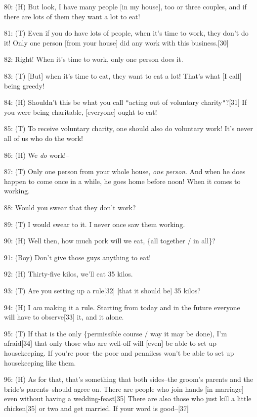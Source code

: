 80: (H) But look, I have many people [in my house], too or three couples, and if
there are lots of them they want a lot to eat!

81: (T) Even if you do have lots of people, when it's time to work, they don't
do it! Only one person [from your house] did any work with this business.[30]

82: Right! When it's time to work, only one person does it.

83: (T) [But] when it's time to eat, they want to eat a lot! That's what [I call]
being greedy!

84: (H) Shouldn't this be what you call \texttt{"}acting out of voluntary charity\texttt{"}?[31]
If you were being charitable, [everyone] ought to eat!

85: (T) To receive voluntary charity, one should also do voluntary work! It's never
all of us who do the work!

86: (H) We \textit{do }work!--

87: (T) Only one person from your whole house, \textit{one person}. And when he
does happen to come once in a while, he goes home before noon! When it comes to
working.

88: Would you swear that they don't work?

89: (T) I would swear to it. I never once saw them working.

90: (H) Well then, how much pork will we eat, \{all together / in all\}?

91: (Boy) Don't give those guys anything to eat!

92: (H) Thirty-five kilos, we'll eat 35 kilos.

93: (T) Are you setting up a rule[32] [that it should be] 35 kilos?

94: (H) I \textit{am} making it a rule. Starting from today and in the future everyone
will have to observe[33] it, and it alone.

95: (T) If that is the only \{permissible course / way it may be done), I'm afraid[34]
that only those who are well-off will [even] be able to set up housekeeping. If
you're poor--the poor and penniless won't be able to set up housekeeping like them.

96: (H) As for that, that's something that both sides--the groom's parents and
the bride's parents--should agree on. There are people who join hands [in marriage]
even without having a wedding-feast\.[35] There are also those who just kill a little
chicken[35] or two and get married. If your word is good--[37]


